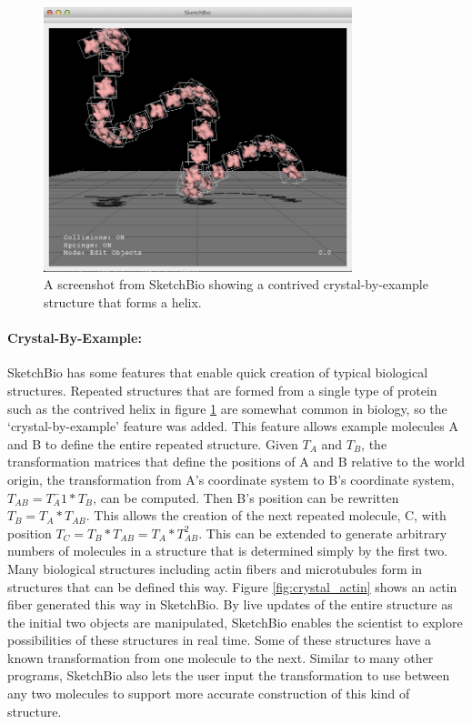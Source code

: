 \documentclass{article} %
\begin{document}
\begin{figure}[h]
\centering
\includegraphics[width=0.8\textwidth]{crystalByExample.png}
\caption{A screenshot from SketchBio showing a contrived crystal-by-example structure that forms a helix.}
\label{fig:crystal_by_example}
\end{figure}
\paragraph{Crystal-By-Example:}
SketchBio has some features that enable quick creation of typical biological structures.  Repeated structures that are formed from a single type of protein such as the contrived helix in figure \ref{fig:crystal_by_example} are somewhat common in biology, so the ‘crystal-by-example' feature was added.  This feature allows example molecules A and B to define the entire repeated structure.  Given $T_A$ and $T_B$, the transformation matrices that define the positions of A and B relative to the world origin, the transformation from A's coordinate system to B's coordinate system, $T_{AB} = T_A^-1*T_B$, can be computed.  Then B's position can be rewritten $T_B = T_A*T_{AB}$.  This allows the creation of the next repeated molecule, C, with position $T_C = T_B*T_{AB} = T_A*T_{AB}^2$.  This can be extended to generate arbitrary numbers of molecules in a structure that is determined simply by the first two.  Many biological structures including actin fibers and microtubules form in structures that can be defined this way.  Figure \ref{fig:crystal_actin} shows an actin fiber generated this way in SketchBio.  By live updates of the entire structure as the initial two objects are manipulated, SketchBio enables the scientist to explore possibilities of these structures in real time.  Some of these structures have a known transformation from one molecule to the next.  Similar to many other programs, SketchBio also lets the user input the transformation to use between any two molecules to support more accurate construction of this kind of structure.
\end{document}
